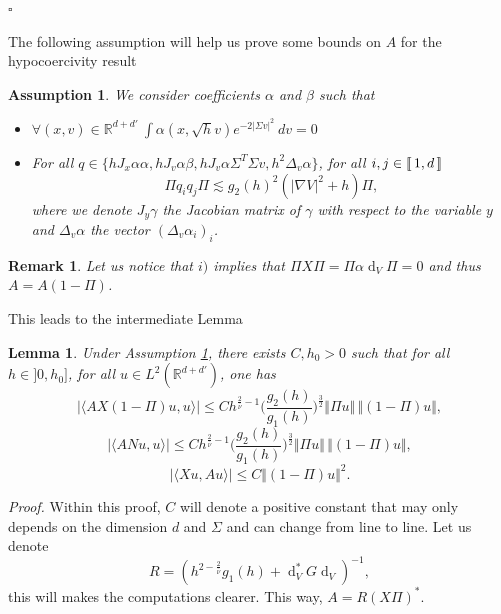 \documentclass[12pt]{amsart}
\newcommand{\R}{\mathbb R}
\def\<{\langle}
\def\>{\rangle}
\newcommand{\bp}{{\it Proof. }}
\newcommand{\ep}{\hfill $\square$}
\renewcommand{\d}{\operatorname{d}}
\numberwithin{equation}{section}
\numberwithin{figure}{section}
\newcommand{\dv}{\ dv}
\newcommand{\lb}{\operatorname{[\negthinspace [}}
\newcommand{\rb}{\operatorname{]\negthinspace ]}}
\newtheorem{lemma}[defin]{Lemma}
\newtheorem{remark}[defin]{Remark}
\newtheorem{assumption}{Assumption}
\begin{document}
\ep

The following assumption will help us prove some bounds on $A$ for the hypocoercivity result

\begin{assumption}\label{ass.hypocoer}
    We consider coefficients $\alpha$ and $\beta$ such that
    \begin{itemize}
        \item[$i)$] $\forall (x,v)\in\R^{d+d'}\ \int \alpha(x,\sqrt{h}v)e^{-2|\Sigma v|^2}\dv = 0$
        \item[$ii)$] For all $q\in\{hJ_x\alpha\alpha,hJ_v\alpha\beta,hJ_v\alpha\Sigma^T\Sigma v,h^2\Delta_v\alpha\}$, for all $i,j\in\lb1,d\rb$
        \begin{equation*}
        \Pi q_iq_j\Pi \lesssim g_2(h)^2(|\nabla V|^2+h)\Pi,
        \end{equation*}
        where we denote $J_y\gamma$ the Jacobian matrix of $\gamma$ with respect to the variable $y$ and $\Delta_v\alpha$ the vector $(\Delta_v\alpha_i)_i$.
    \end{itemize}
\end{assumption}

\begin{remark}
    Let us notice that $i)$ implies that $\Pi X\Pi = \Pi\alpha\d_V\Pi = 0$ and thus $A = A(1-\Pi)$.
\end{remark}


This leads to the intermediate Lemma

\begin{lemma}\label{lem:bounds}
    Under Assumption \ref{ass.hypocoer}, there exists $C,h_0>0$ such that for all $h\in]0,h_0]$, for all $u\in L^2(\R^{d+d'})$, one has
    \begin{equation}\label{eq:maj1}
    |\<AX (1-\Pi)u,u\>|\leq Ch^{\frac{2}{\overline\nu}-1}\Big(\frac{g_2(h)}{g_1(h)}\Big)^{\frac32}\Vert \Pi u\Vert\, \Vert(1- \Pi) u\Vert,
    \end{equation}
    \begin{equation}\label{eq:maj2}
    |\<AN u,u\>|\leq Ch^{\frac{2}{\overline\nu}-1}\Big(\frac{g_2(h)}{g_1(h)}\Big)^{\frac32}\Vert \Pi u\Vert\, \Vert(1- \Pi) u\Vert,
    \end{equation}
    \begin{equation}\label{eq:maj3}
    |\<X u,A u\>|\leq C\Vert(1- \Pi) u\Vert^2.
    \end{equation}
\end{lemma}
\bp
Within this proof, $C$ will denote a positive constant that may only depends on the dimension $d$ and $\Sigma$ and can change from line to line. Let us denote
\begin{equation}\label{eq:defR}
R = (h^{2-\frac2{\overline{\nu}}}g_1(h) + \d_V^*G\d_V)^{-1},
\end{equation}
this will makes the computations clearer. This way, $A = R(X\Pi)^*$.
\end{document}
